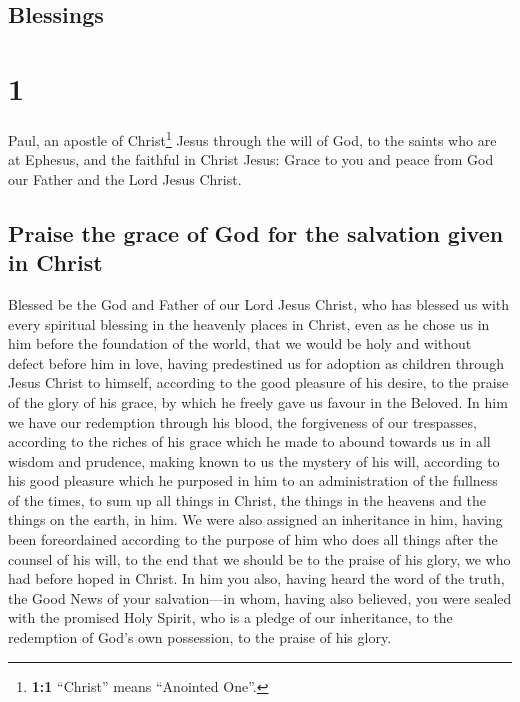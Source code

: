 \hypertarget{blessings}{%
\subsection{Blessings}\label{blessings}}

\hypertarget{section}{%
\section{1}\label{section}}

 Paul, an apostle of Christ\footnote{\textbf{1:1}
  ``Christ'' means ``Anointed One''.} Jesus through the will of God, to
the saints who are at Ephesus, and the faithful in Christ Jesus:
 Grace to you and peace from God our Father and the Lord
Jesus Christ.

\hypertarget{praise-the-grace-of-god-for-the-salvation-given-in-christ}{%
\subsection{Praise the grace of God for the salvation given in
Christ}\label{praise-the-grace-of-god-for-the-salvation-given-in-christ}}

 Blessed be the God and Father of our Lord Jesus Christ,
who has blessed us with every spiritual blessing in the heavenly places
in Christ,  even as he chose us in him before the
foundation of the world, that we would be holy and without defect before
him in love,  having predestined us for adoption as
children through Jesus Christ to himself, according to the good pleasure
of his desire,  to the praise of the glory of his grace,
by which he freely gave us favour in the Beloved.  In him
we have our redemption through his blood, the forgiveness of our
trespasses, according to the riches of his grace  which he
made to abound towards us in all wisdom and prudence, 
making known to us the mystery of his will, according to his good
pleasure which he purposed in him  to an administration
of the fullness of the times, to sum up all things in Christ, the things
in the heavens and the things on the earth, in him.  We
were also assigned an inheritance in him, having been foreordained
according to the purpose of him who does all things after the counsel of
his will,  to the end that we should be to the praise of
his glory, we who had before hoped in Christ.  In him you
also, having heard the word of the truth, the Good News of your
salvation---in whom, having also believed, you were sealed with the
promised Holy Spirit,  who is a pledge of our
inheritance, to the redemption of God's own possession, to the praise of
his glory.

